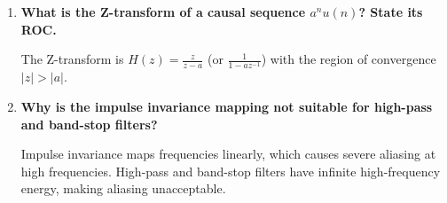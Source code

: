 \documentclass[12pt,a4paper]{article}
\newcommand{\Q}[1]{\textbf{#1}\par\noindent\ignorespaces}
\begin{document}
\begin{tcolorbox}[exambox, title={\textbf{Frequently Asked / Viva Questions}}]
\begin{enumerate}[topsep=0pt, label=\textbf{Q\arabic*.}, itemsep=5pt]
    The system is stable if its Z-transform region of convergence (ROC) contains the unit circle ($|z|=1$), which requires all poles to lie strictly inside the unit circle.
  \item \Q{What is the Z-transform of a causal sequence $a^n u(n)$? State its ROC.}
    The Z-transform is $H(z) = \frac{z}{z-a}$ (or $\frac{1}{1-a z^{-1}}$) with the region of convergence $|z| > |a|$.
  \item \Q{Why is the impulse invariance mapping not suitable for high-pass and band-stop filters?}
    Impulse invariance maps frequencies linearly, which causes severe aliasing at high frequencies. High-pass and band-stop filters have infinite high-frequency energy, making aliasing unacceptable.
\end{enumerate}
\end{tcolorbox}
\end{document}
